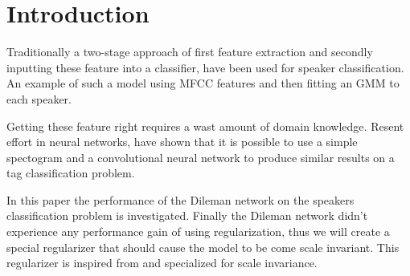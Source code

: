\section{Introduction}

Traditionally a two-stage approach of first feature extraction and secondly inputting these feature into a classifier, have been used for speaker classification. An example of such a model using MFCC features and then fitting an GMM to each speaker.

Getting these feature right requires a wast amount of domain knowledge. Resent effort \cite{dieleman} in neural networks, have shown that it is possible to use a simple spectogram and a convolutional neural network to produce similar results on a tag classification problem.

In this paper the performance of the Dileman \cite{dieleman} network on the speakers classification problem is investigated. Finally the Dileman network didn't experience any performance gain of using regularization\cite{dieleman}, thus we will create a special regularizer that should cause the model to be come scale invariant. This regularizer is inspired from \cite{scale-invariante} and specialized for scale invariance.